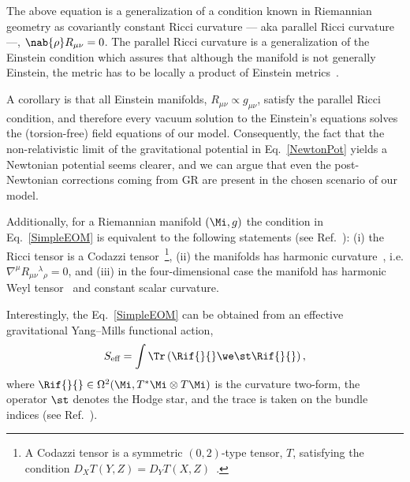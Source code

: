 \documentclass[aps,prl,twocolumn,superscriptaddress,showpacs,showkeys]{revtex4-1}
\begin{document}
The above equation is a generalization of a condition known in Riemannian geometry as covariantly constant Ricci curvature --- aka parallel Ricci curvature ---, \mbox{$\nab{\rho} R_{\mu\nu} = 0$.} The parallel Ricci curvature is a generalization of the Einstein condition which assures that although the manifold is not generally Einstein, the metric has to be locally a product of Einstein metrics~\cite{Besse}.

A corollary is that all Einstein manifolds, \mbox{$R_{\mu\nu} \propto g_{\mu\nu}$,} satisfy the parallel Ricci condition, and therefore every vacuum solution to the Einstein's equations solves the (torsion-free) field equations of our model. Consequently, the fact that the non-relativistic limit of the gravitational potential in Eq.~\eqref{NewtonPot} yields a Newtonian potential seems clearer, and we can argue that even the post-Newtonian corrections coming from GR are present in the chosen scenario of our model.

Additionally, for a Riemannian manifold $(\Mi,g)$ the condition in Eq.~\eqref{SimpleEOM} is equivalent to the following statements (see Ref.~\cite{Derdzinski:1985,Besse}): (i) the Ricci tensor is a Codazzi tensor~\footnote{A Codazzi tensor is a symmetric $(0,2)$-type tensor, $T$, satisfying the condition \mbox{$D_X T(Y,Z) = D_Y T(X,Z)$~\cite{Derdzinski01071983}.}}, (ii) the manifolds has harmonic curvature~\cite{bourguignon1981varietes}, i.e. \mbox{$\nabla^\mu R_{\mu\nu}{}^\lambda{}_\rho = 0$,} and (iii) in the four-dimensional case the manifold has harmonic Weyl tensor~\cite{Berger:1969} and constant scalar curvature.

Interestingly, the Eq.~\eqref{SimpleEOM} can be obtained from an effective gravitational Yang--Mills functional action,
\begin{equation}
  S_{\text{eff}} = \int \Tr \left( \Rif{}{} \we \st \Rif{}{} \right),
\end{equation}
where $\Rif{}{} \in \Omega^2(\Mi, T^*\Mi \otimes T\Mi)$ is the curvature two-form, the operator $\st$ denotes the Hodge star, and the trace is taken on the bundle indices (see Ref.~\cite{bourguignon1982yang}).
\end{document}
